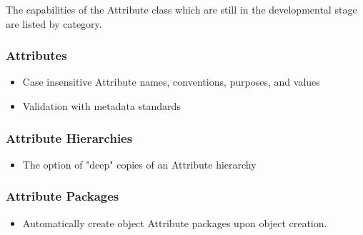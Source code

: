%

The capabilities of the Attribute class which are still in the developmental stage are listed by category.
 
\subsubsection{Attributes}

\begin{itemize}
\item Case insensitive Attribute names, conventions, purposes, and values
\item Validation with metadata standards
\end{itemize}

\subsubsection{Attribute Hierarchies}

\begin{itemize}
\item The option of "deep" copies of an Attribute hierarchy
\end{itemize}

\subsubsection{Attribute Packages}

\begin{itemize}
\item Automatically create object Attribute packages upon object creation.
\end{itemize}
